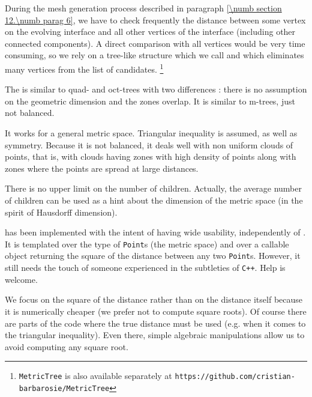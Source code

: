 During the mesh generation process described in paragraph \ref{\numb section 12.\numb parag 6},
we have to check frequently the distance between
some vertex on the evolving interface and all other vertices of the interface
(including other connected components).
A direct comparison with all vertices would be very time consuming, so we rely on a tree-like
structure which we call {\small\tt{}} and which eliminates many vertices from the list
of candidates.%
\footnote {{\footnotesize\tt MetricTree} is also available separately at
{\footnotesize\tt https://github.com/cristian-barbarosie/MetricTree}}

The {\small\tt{}} is similar to quad- and oct-trees with two differences :
there is no assumption on the geometric dimension and the zones overlap.
It is similar to m-trees, just not balanced.

It works for a general metric space.
Triangular inequality is assumed, as well as symmetry.
Because it is not balanced, it deals well with non uniform clouds of points, that is,
with clouds having zones with
high density of points along with zones where the points are spread at large distances.

There is no upper limit on the number of children.
Actually, the average number of children can be used as a hint about the dimension of the
metric space (in the spirit of Hausdorff dimension).

{\small\tt {}} has been implemented with the intent of having wide usability,
independently of \maniFEM.
It is templated over the type of {\small\tt Point}s (the metric space) and over a callable
object returning the square of the distance between any two {\small\tt Point}s.
However, it still needs the touch of someone experienced in the subtleties of {\tt C++}.
Help is welcome.

We focus on the square of the distance rather than on the distance itself because it
is numerically cheaper (we prefer not to compute square roots).
Of course there are parts of the code where the true distance must be used
(e.g. when it comes to the triangular inequality).
Even there, simple algebraic manipulations allow us to avoid computing any square root.

